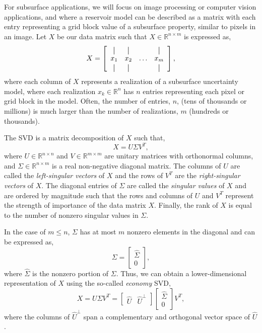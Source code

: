 \documentclass[a4paper,fleqn,12pt]{article}
\begin{document}
For subsurface applications, we will focus on image processing or computer vision applications, and where a reservoir model can be described as a matrix with each entry representing a grid block value of a subsurface property, similar to pixels in an image. Let $X$ be our data matrix such that $X\in \mathbb{R}^{n\times m}$ is expressed as, 
\begin{equation}
    X = \left[\begin{array}{cccc}
                        \vertbar & \vertbar &        & \vertbar \\
                        x_{1}    & x_{2}    & \ldots & x_{m}    \\
                        \vertbar & \vertbar &        & \vertbar 
                        \end{array}\right], 
\end{equation}
where each column of $X$ represents a realization of a subsurface uncertainty model, where each realization $x_k\in\mathbb{R}^n$ has $n$ entries representing each pixel or grid block in the model. Often, the number of entries, $n$, (tens of thousands or millions) is much larger than the number of realizations, $m$ (hundreds or thousands). 

The SVD is a matrix decomposition of $X$ such that,
\begin{equation}
    X = U\Sigma V^T ,
\end{equation}
where $U\in\mathbb{R}^{n\times n}$ and $V\in\mathbb{R}^{m\times m}$ are unitary matrices with orthonormal columns, and $\Sigma\in\mathbb{R}^{n\times m}$ is a real non-negative diagonal matrix. The columns of $U$ are called the \emph{left-singular vectors} of $X$ and the rows of $V^T$ are the \emph{right-singular vectors} of $X$. The diagonal entries of $\Sigma$ are called the \emph{singular values} of $X$ and are ordered by magnitude such that the rows and columns of $U$ and $V^T$ represent the strength of importance of the data matrix $X$. Finally, the rank of $X$ is equal to the number of nonzero singular values in $\Sigma$.

In the case of $m\leq n$, $\Sigma$ has at most $m$ nonzero elements in the diagonal and can be expressed as,
\begin{equation}
    \Sigma = \begin{bmatrix} \hat{\Sigma} \\ 0 \end{bmatrix} ,
\end{equation}
where $\hat{\Sigma}$ is the nonzero portion of $\Sigma$. Thus, we can obtain a lower-dimensional representation of $X$ using the so-called \emph{economy} SVD,
\begin{equation}
    X = U\Sigma V^T = 
    \begin{bmatrix} \hat{U} & \hat{U}^\perp \end{bmatrix}
    \begin{bmatrix} \hat{\Sigma} \\ 0 \end{bmatrix}
    V^T ,
\end{equation}
where the columns of $\hat{U}^\perp$ span a complementary and orthogonal vector space of $\hat{U}$.
\end{document}
